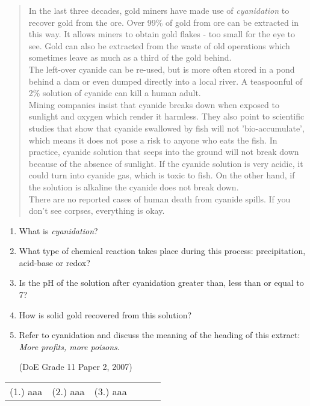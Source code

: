 \begin{eocexercises}{}
\begin{enumerate}
{\begin{quote}
{In the last three decades, gold miners have made use of \textit{cyanidation} to recover gold from the ore. Over 99\% of gold from ore can be extracted in this way. It allows miners to obtain gold flakes - too small for the eye to see. Gold can also be extracted from the waste of old operations which sometimes leave as much as a third of the gold behind.\\

The left-over cyanide can be re-used, but is more often stored in a pond behind a dam or even dumped directly into a local river. A teaspoonful of 2\% solution of cyanide can kill a human adult.\\

Mining companies insist that cyanide breaks down when exposed to sunlight and oxygen which render it harmless. They also point to scientific studies that show that cyanide swallowed by fish will not 'bio-accumulate', which means it does not pose a risk to anyone who eats the fish. In practice, cyanide solution that seeps into the ground will not break down because of the absence of sunlight. If the cyanide solution is very acidic, it could turn into cyanide gas, which is toxic to fish. On the other hand, if the solution is alkaline the cyanide does not break down.\\

There are no reported cases of human death from cyanide spills. If you don't see corpses, everything is okay.
}
\end{quote}
}
\begin{enumerate}
\item{What is \textit{cyanidation}?}
\item{What type of chemical reaction takes place during this process: precipitation, acid-base or redox?}
\item{Is the pH of the solution after cyanidation greater than, less than or equal to 7?}
\item{How is solid gold recovered from this solution?}
\item{Refer to cyanidation and discuss the meaning of the heading of this extract: \textit{More profits, more poisons}.}

(DoE Grade 11 Paper 2, 2007)
\end{enumerate}
\end{enumerate}

\practiceinfo

\begin{tabular}[h]{cccccc}
(1.) aaa & (2.) aaa & (3.) aaa & 
 \end{tabular}
\end{eocexercises}










